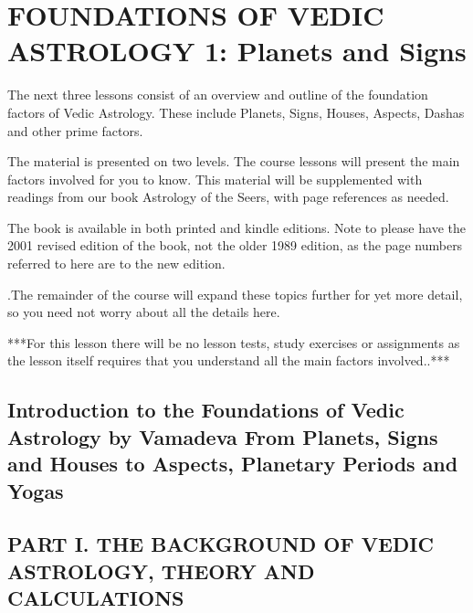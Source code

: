 \section{FOUNDATIONS OF VEDIC ASTROLOGY 1: Planets and Signs}
 

The next three lessons consist of an overview and outline of the foundation factors of Vedic Astrology. These include Planets, Signs, Houses, Aspects, Dashas and other prime factors.

The material is presented on two levels. The course lessons will present the main factors involved for you to know. This material will be supplemented with readings from our book Astrology of the Seers, with page references as needed.

The book is available in both printed and kindle editions. Note to please have the 2001 revised edition of the book, not the older 1989 edition, as the page numbers referred to here are to the new edition.

.The remainder of the course will expand these topics further for yet more detail, so you need not worry about all the details here.

 



 

***For this lesson there will be no lesson tests, study exercises or assignments as the lesson itself requires that you understand all the main factors involved..***

 



\subsection{\textbf{Introduction to the Foundations of Vedic Astrology by Vamadeva
From Planets, Signs and Houses to Aspects, Planetary Periods and Yogas}}

 

\subsection{PART I. THE BACKGROUND OF VEDIC ASTROLOGY, THEORY AND CALCULATIONS}
 

